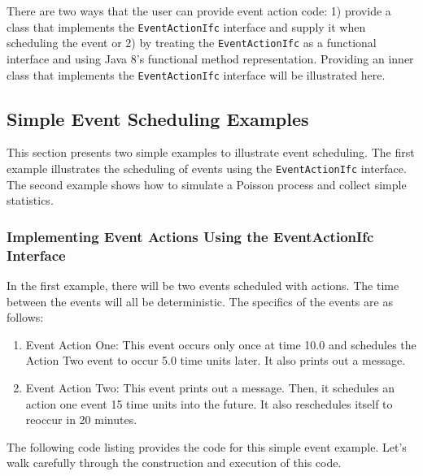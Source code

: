 \documentclass[
]{book}
\providecommand{\tightlist}{%
  \setlength{\itemsep}{0pt}\setlength{\parskip}{0pt}}
\theoremstyle{definition}
\theoremstyle{definition}
\theoremstyle{definition}
\theoremstyle{definition}
\theoremstyle{remark}
\begin{document}
There are two ways that the user can
provide event action code: 1) provide a class that implements the
\texttt{EventActionIfc} interface and supply it when scheduling the event or 2)
by treating the \texttt{EventActionIfc} as a functional interface and using Java 8's functional method representation. Providing an inner class that implements the \texttt{EventActionIfc} interface will be illustrated here.

\hypertarget{simple-event-scheduling-examples}{%
\subsection{Simple Event Scheduling Examples}\label{simple-event-scheduling-examples}}

This section presents two simple examples to illustrate event
scheduling. The first example illustrates the scheduling of events using the \texttt{EventActionIfc} interface. The second example shows how to simulate a Poisson process and collect
simple statistics.

\hypertarget{implementing-event-actions-using-the-eventactionifc-interface}{%
\subsubsection{Implementing Event Actions Using the EventActionIfc Interface}\label{implementing-event-actions-using-the-eventactionifc-interface}}

In the first example, there will be two events scheduled with actions.
The time between the events will all be deterministic. The specifics of
the events are as follows:

\begin{enumerate}
\def\labelenumi{\arabic{enumi}.}
\tightlist
\item
  Event Action One: This event occurs only once at time 10.0 and schedules the Action Two event to occur 5.0 time units later. It also prints out a message.
\item
  Event Action Two: This event prints out a message. Then, it schedules an action one event 15 time units into the future. It also reschedules itself to reoccur in 20 minutes.
\end{enumerate}

The following code listing provides the code for this simple event
example. Let's walk carefully through the construction and execution of
this code.
\end{document}
